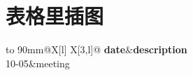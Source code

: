 \documentclass{article}%
\begin{document}
%
\normalsize%
\section{表格里插图}%
\label{sec:}%


\begin{table}[htpb]%
\centering%
\caption{外观检测}%
\label{tbl:inspect}%
\begin{tabu}to 90mm{@{}X[l] X[3,l]@{}}%
\toprule%
\textbf{date}&\textbf{description}\\%
10{-}05&meeting\\\bottomrule%
%
\end{tabu}%
\end{table}

%
\end{document}
